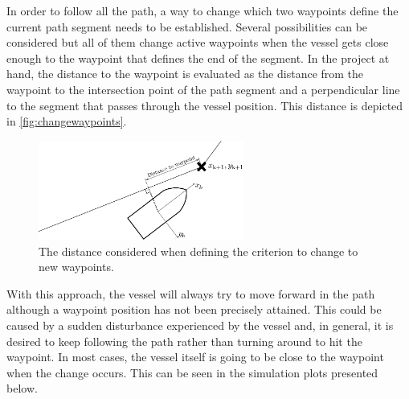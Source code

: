 In order to follow all the path, a way to change which two waypoints define the current path segment needs to be established. Several possibilities can be considered but all of them change active waypoints when the vessel gets close enough to the waypoint that defines the end of the segment. In the project at hand, the distance to the waypoint is evaluated as the distance from the waypoint to the intersection point of the path segment and a perpendicular line to the segment that passes through the vessel position. This distance is depicted in \autoref{fig:changewaypoints}.
\begin{figure}[H]
	\includegraphics[width=0.6\textwidth]{figures/LOSalgorithmdistancewp}
	\caption{The distance considered when defining the criterion to change to new waypoints.}
	\label{fig:changewaypoints}
\end{figure}
With this approach, the vessel will always try to move forward in the path although a waypoint position has not been precisely attained. %
This could be caused by a sudden disturbance experienced by the vessel and, in general, it is desired to keep following the path rather than turning around to hit the waypoint. In most cases, the vessel itself is going to be close to the waypoint when the change occurs. This can be seen in the simulation plots presented below. 

	



